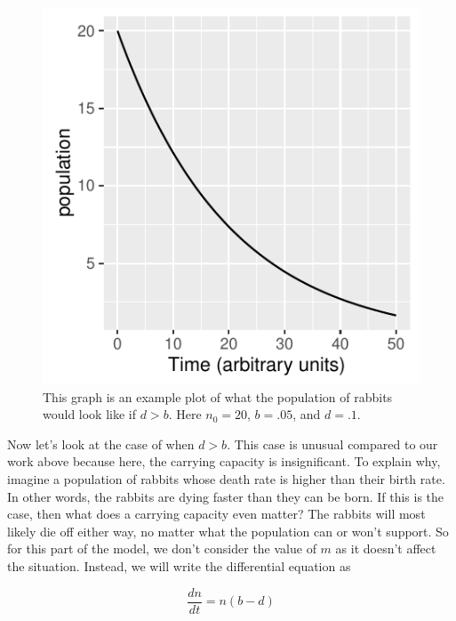 \documentclass[titlepage]{article}\usepackage[]{graphicx}\usepackage[]{color}
\makeatletter
\def\maxwidth{ %
  \ifdim\Gin@nat@width>\linewidth
    \linewidth
  \else
    \Gin@nat@width
  \fi
}
\newenvironment{knitrout}{}{} %
\makeatother
\begin{document}
\begin{figure}
\begin{knitrout}
\color{fgcolor}

{\centering \includegraphics[width=\maxwidth]{figure/unnamed-chunk-4-1} 

}



\end{knitrout}
\caption{This graph is an example plot of what the population of rabbits would look like if \(d > b\). Here \(n_0 = 20\), \(b = .05\), and \(d = .1\).}
\end{figure}

Now let's look at the case of when \(d > b\). This case is unusual compared to our work above because here, the carrying capacity is insignificant. To explain why, imagine a population of rabbits whose death rate is higher than their birth rate. In other words, the rabbits are dying faster than they can be born. If this is the case, then what does a carrying capacity even matter? The rabbits will most likely die off either way, no matter what the population can or won't support. So for this part of the model, we don't consider the value of \(m\) as it doesn't affect the situation. Instead, we will write the differential equation as 

\begin{equation}
\frac{dn}{dt} = n(b-d)
\end {equation}
\end{document}
